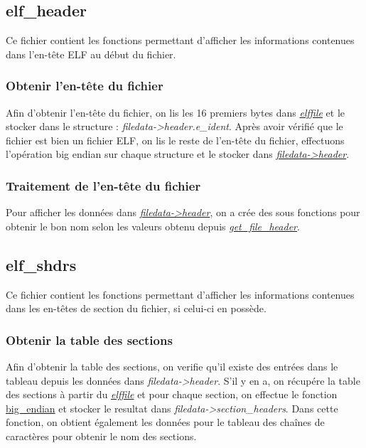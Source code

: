 \documentclass[a4paper]{article} %
\begin{document}

\subsection{elf\_header}
\label{sec:elfheader}
\noindent Ce fichier contient les fonctions permettant d'afficher les informations 
contenues dans l'en-tête ELF au début du fichier.

\subsubsection*{Obtenir l'en-tête du fichier}
\label{sec:getfheader}
Afin d'obtenir l'en-tête du fichier, on lis les 16 premiers bytes dans \hyperref[sec:elffile]{\textit{elffile}}
et le stocker dans le structure : \textit{filedata->header.e\_ident}.
Après avoir vérifié que le fichier est bien un fichier ELF, on lis le 
reste de l'en-tête du fichier, effectuons l'opération big endian sur chaque 
structure et le stocker dans \hyperref[sec:filedata]{\textit{filedata->header}}.

\subsubsection*{Traitement de l'en-tête du fichier}
Pour afficher les données dans \hyperref[sec:filedata]{\textit{filedata->header}}, 
on a crée des sous fonctions pour obtenir le bon nom selon les valeurs obtenu depuis 
\hyperref[sec:getfheader]{\textit{get\_file\_header}}.




\subsection{elf\_shdrs}
\label{sec:sectionheader}
\noindent Ce fichier contient les fonctions permettant d'afficher les informations 
contenues dans les en-têtes de section du fichier, si celui-ci en possède.

\subsubsection*{Obtenir la table des sections}
Afin d'obtenir la table des sections, on verifie qu'il existe des entrées 
dans le tableau depuis les données dans \textit{filedata->header}. S'il y en a, on
récupére la table des sections à partir du \hyperref[sec:elffile]{\textit{elffile}} 
et pour chaque section, on effectue le fonction \hyperref[sec:endian]{big\_endian} et stocker 
le resultat dans \textit{filedata->section\_headers}. Dans cette fonction, on obtient 
également les données pour le tableau des chaînes de caractères pour obtenir le nom 
des sections.
\end{document}
